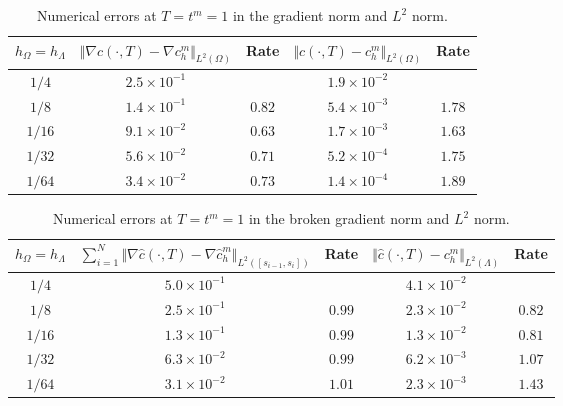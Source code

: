 \documentclass[pdflatex,sn-mathphys-num]{sn-jnl}%
\theoremstyle{thmstyleone}%
\theoremstyle{thmstyletwo}%
\theoremstyle{thmstylethree}%
\begin{document}
\begin{table}[t]
    \centering
    \caption{Numerical errors at $T=t^m=1$ in the gradient norm and $L^2$ norm. }
    \begin{tabular}{|c|c|c|c|c|}
    \hline
        $h_\Omega = h_\Lambda$ & $\Vert \nabla c(\cdot,T)-\nabla c_h^m\Vert_{L^2(\Omega)}$ & Rate & $\Vert c(\cdot,T)- c_h^m \Vert _{L^2(\Omega)}$ & Rate \\
        \hline 
        $1/4$ & $2.5\times 10^{-1}$ & & $1.9\times 10^{-2}$ &    \\
        $1/8$ & $1.4 \times 10^{-1}$ & $0.82$ & $5.4\times 10^{-3}$ & $1.78$ \\
        $1/16$ & $9.1 \times 10^{-2}$ & $0.63$ & $1.7 \times 10^{-3}$ & $1.63$ \\
        $1/32$ & $5.6 \times 10^{-2}$ & $0.71$ & $5.2\times 10^{-4}$ & $1.75$ \\
        $1/64$ & $3.4 \times 10 ^{-2}$ & $0.73$ & $1.4\times 10^{-4}$ & $1.89$ \\
        \hline
    \end{tabular}
    \label{tab:convrates_exactsoln3d}
\end{table}

\begin{table}[t]
    \centering
    \caption{Numerical errors at $T=t^m=1$ in the broken gradient norm and $L^2$ norm.  }
    \begin{tabular}{|c|c|c|c|c|}
    \hline
        $h_\Omega=h_\Lambda$ & $\displaystyle\sum_{i=1}^N \Vert \nabla \hat c(\cdot,T) - \nabla \hat c_h^m\Vert_{L^2([s_{i-1},s_i])}$ & Rate & $\Vert \hat c(\cdot,T) - c_h^m \Vert_{L^2(\Lambda)}$ & Rate \\
        \hline 
      $1/4$ & $5.0 \times 10^{-1}$ & & $4.1 \times 10^{-2}$ & \\
        $1/8$ & $2.5 \times 10^{-1}$ & $0.99$ & $2.3 \times 10^{-2}$ & $0.82$\\
      $1/16$ & $1.3 \times 10^{-1}$ & $0.99$ & $1.3 \times 10^{-2}$  & $0.81$ \\
        $1/32$ & $6.3 \times 10^{-2}$ & $0.99$ & $6.2 \times 10^{-3}$ & $1.07$ \\
        $1/64$ & $3.1 \times 10^{-2}$ & $1.01$ & $2.3 \times 10^{-3}$ & $1.43$ \\
        \hline
    \end{tabular}
    \label{tab:convrates_exactsoln1D}
\end{table}
\end{document}
